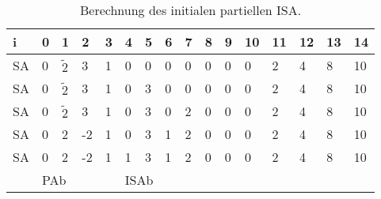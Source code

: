 \begin{table}
	\begin{tabular}{l|llll|llll|lllllll}
		i  & 0 & 1                         & 2                          & 3 & 4                         & 5                         & 6                         & 7                         & 8 & 9 & 10 & 11 & 12 & 13 & 14 \\ \hline
		SA & 0 & $\widetilde{2}$           & 3                          & 1 & 0                         & 0                         & 0                         & 0                         & 0 & 0 & 0  & 2  & 4  & 8  & 10 \\ \hline
		SA & 0 & $\widetilde{2}$           & 3                          & 1 & 0                         & \cellcolor[HTML]{32CB00}3 & 0                         & 0                         & 0 & 0 & 0  & 2  & 4  & 8  & 10 \\ \hline
		SA & 0 & $\widetilde{2}$           & 3                          & 1 & 0                         & 3                         & 0                         & \cellcolor[HTML]{32CB00}2 & 0 & 0 & 0  & 2  & 4  & 8  & 10 \\ \hline
		SA & 0 & \cellcolor[HTML]{3166FF}2 & \cellcolor[HTML]{32CB00}-2 & 1 & 0                         & 3                         & \cellcolor[HTML]{32CB00}1 & 2                         & 0 & 0 & 0  & 2  & 4  & 8  & 10 \\ \hline
		SA & 0 & 2                         & -2                         & 1 & \cellcolor[HTML]{32CB00}1 & 3                         & 1                         & 2                         & 0 & 0 & 0  & 2  & 4  & 8  & 10 \\ \hline
		& \multicolumn{4}{l|}{PAb}                                       & \multicolumn{4}{l|}{ISAb}                                                                                     &   &   &    &    &    &    &   
	\end{tabular}
	\caption{Berechnung des initialen partiellen ISA.}
	\label{dss:table:isa}
\end{table}

